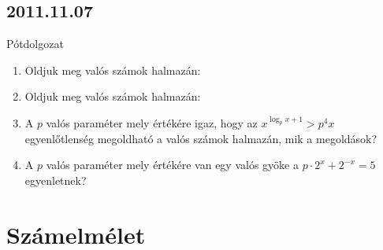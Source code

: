 \subsection*{2011.11.07}Pótdolgozat

\begin{enumerate}
		\item Oldjuk meg valós számok halmazán:

        \item Oldjuk meg valós számok halmazán:
        \item A $p$ valós paraméter mely értékére igaz, hogy az $x^{\log_{p}x+1}>p^{4}x$ egyenlőtlenség megoldható a valós számok halmazán, mik a megoldások?
        \item A $p$ valós paraméter mely értékére van egy valós gyöke a $p\cdot2^{x}+2^{-x}=5$ egyenletnek?
        
\end{enumerate}
	
	
	\section{Számelmélet}
	
	
	
